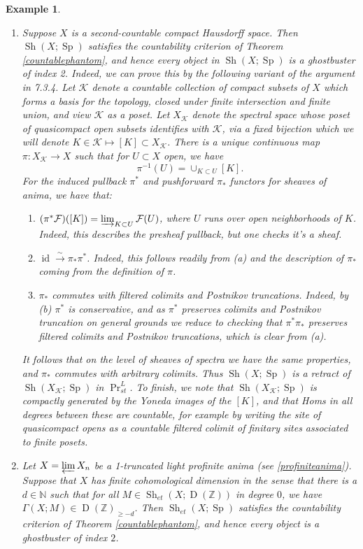 \documentclass[12pt]{article}
\newtheorem{example}[theorem]{Example}
\newcommand{\on}{\operatorname}
\newcommand{\mbb}{\mathbb}
\begin{document}
\begin{example}\label{countableexamples}
\begin{enumerate}
\item Suppose $X$ is a second-countable compact Hausdorff space.  Then $\on{Sh}(X;\on{Sp})$ satisfies the countability criterion of Theorem \ref{countablephantom}, and hence every object in $\on{Sh}(X;\on{Sp})$ is a ghostbuster of index 2.  Indeed, we can prove this by the following variant of the argument in \cite{LurieHTT} 7.3.4.  Let $\mathcal{K}$ denote a countable collection of compact subsets of $X$ which forms a basis for the topology, closed under finite intersection and finite union, and view $\mathcal{K}$ as a poset.  Let $X_\mathcal{K}$ denote the spectral space whose poset of quasicompact open subsets identifies with $\mathcal{K}$, via a fixed bijection which we will denote $K\in \mathcal{K} \mapsto [K]\subset X_\mathcal{K}$.  There is a unique continuous map $\pi:X_\mathcal{K}\to X$ such that for $U\subset X$ open, we have
$$\pi^{-1}(U) = \cup_{K\subset U} [K].$$
For the induced pullback $\pi^\ast$ and pushforward $\pi_\ast$ functors for sheaves of anima, we have that:
\begin{enumerate}
\item $(\pi^\ast\mathcal{F})([K]) = \varinjlim_{K\subset U}\mathcal{F}(U)$, where $U$ runs over open neighborhoods of $K$.  Indeed, this describes the presheaf pullback, but one checks it's a sheaf.
\item $\on{id}\overset{\sim}{\rightarrow} \pi_\ast \pi^\ast$.  Indeed, this follows readily from (a) and the description of $\pi_\ast$ coming from the definition of $\pi$.
\item $\pi_\ast$ commutes with filtered colimits and Postnikov truncations.  Indeed, by (b) $\pi^\ast$ is conservative, and as $\pi^\ast$ preserves colimits and Postnikov truncation on general grounds we reduce to checking that $\pi^\ast \pi_\ast$ preserves filtered colimits and Postnikov truncations, which is clear from (a).
\end{enumerate}
It follows that on the level of sheaves of spectra we have the same properties, and $\pi_\ast$ commutes with arbitrary colimits.  Thus $\on{Sh}(X;\on{Sp})$ is a retract of $\on{Sh}(X_\mathcal{K};\on{Sp})$ in $\on{Pr}^L_{st}$.  To finish, we note that $\on{Sh}(X_\mathcal{K};\on{Sp})$ is compactly generated by the Yoneda images of the $[K]$, and that Homs in all degrees between these are countable, for example by writing the site of quasicompact opens as a countable filtered colimit of finitary sites associated to finite posets.
\item Let $X = \varprojlim X_n$ be a 1-truncated light profinite anima (see \ref{profiniteanima}).  Suppose that $X$ has finite cohomological dimension in the sense that there is a $d\in\mathbb{N}$ such that for all $M\in\on{Sh}_{et}(X;\on{D}(\mbb{Z}))$ in degree $0$, we have $\Gamma(X;M)\in \on{D}(\mbb{Z})_{\geq -d}$.  Then $\on{Sh}_{et}(X;\on{Sp})$ satisfies the countability criterion of Theorem \ref{countablephantom}, and hence every object is a ghostbuster of index $2$.


\end{enumerate}
\end{example}
\end{document}
